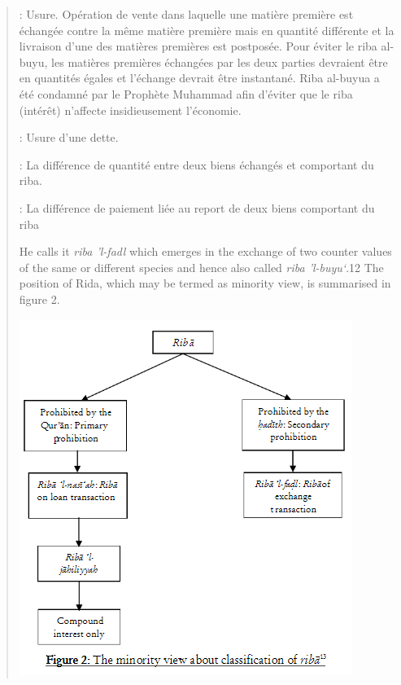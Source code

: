 \begin{quote}
\begin{Def}
 : Usure. Opération de vente dans laquelle une matière première est échangée contre la même matière première mais en quantité différente et la livraison d’une des matières premières est postposée. Pour éviter le riba al-buyu, les matières premières échangées par les deux parties devraient être en quantités égales et l’échange devrait être instantané. Riba al-buyua a été condamné par le Prophète Muhammad afin d’éviter que le riba (intérêt) n’affecte insidieusement l’économie.
\end{Def}
\begin{Def} : Usure d’une dette.
\end{Def}
 
\begin{Def} : La différence de quantité entre deux biens échangés et comportant du riba.
\end{Def}
\begin{Def} : La différence de paiement liée au report de deux biens comportant du riba
\end{Def} He calls it \textit{riba 'l-fadl} which emerges in the exchange of two counter values of the same or different species and hence also called \textit{riba 'l-buyu‘}.12 The position of Rida, which may be termed as minority view, is summarised in figure 2.


\includegraphics[width=\textwidth]{CourantsIslamContemporain/ImagesCourantsIslamContemporain/RibaRida.png}


\end{quote}

